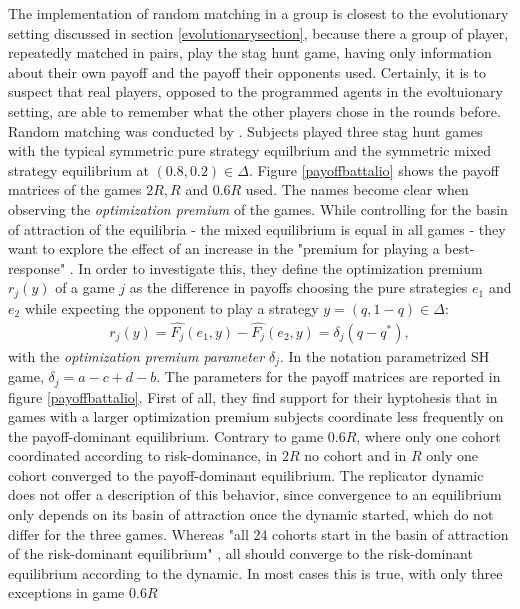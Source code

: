 \documentclass[11pt]{article}
\begin{document}
The implementation of random matching in a group is closest to the 
evolutionary setting discussed in section \ref{evolutionarysection}, because
there a group of player, repeatedly matched in pairs, play the stag hunt 
game, having only information about their own payoff and the payoff their
opponents used. Certainly, it is to suspect that real players, opposed
to the programmed agents in the evoltuionary setting, are able to remember
what the other players chose in the rounds before. 
Random matching was conducted by \textcite{battalio_optimization_2001}. 
Subjects played three stag hunt games with the typical symmetric pure strategy
equilbrium and the symmetric mixed strategy equilibrium at $(0.8,0.2) \in
\Delta$. Figure \ref{payoffbattalio} shows the payoff matrices of the
games $2R, R$ and $0.6R$ used. The names become clear when observing the 
\textit{optimization premium} of the games. While controlling for the basin of 
attraction of the equilibria - the mixed equilibrium is equal in all games -
they want to explore the effect of an increase in the "premium for playing
a best-response" \parencite[751]{battalio_optimization_2001}. 
In order to investigate this, they define the optimization premium $r_j(y)$ of 
a game $j$ as the difference in payoffs choosing the pure strategies 
$e_1$ and $e_2$ while expecting the opponent to play a strategy 
$y=(q,1-q) \in \Delta$:
\begin{align}
        r_j(y)= \hat{F_j}(e_1,y) - \hat{F_j}(e_2,y) = \delta_j(q-q^*),
\end{align}
with the \textit{optimization premium parameter} $\delta_j$. In the notation
parametrized SH game, $\delta_j = a - c + d - b$.
The parameters for the payoff matrices are reported in figure 
\ref{payoffbattalio}. 
First of all, they find support for their hyptohesis that in games with a 
larger optimization premium subjects coordinate less frequently on the 
payoff-dominant equilibrium. 
Contrary to game $0.6R$, where only one cohort coordinated according 
to risk-dominance, in $2R$ no cohort and in $R$ only one cohort 
converged to the payoff-dominant equilibrium. The replicator dynamic does 
not offer a description of this behavior, since convergence to an 
equilibrium only depends on its basin of attraction once the dynamic 
started, which do not differ for the three games. 
Whereas "all 24 cohorts start in the basin of attraction
of the risk-dominant equilibrium" \parencite{battalio_optimization_2001}, 
all should converge to the risk-dominant equilibrium according to the dynamic.
In most cases this is true, with only three exceptions in game $0.6R$ 
\end{document}
